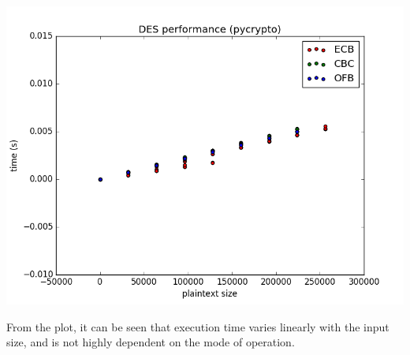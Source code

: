 \documentclass[main.tex]{subfiles}
\begin{document}

\includegraphics[width=\textwidth]{plot.png}

From the plot, it can be seen that execution time varies linearly with the input
size, and is not highly dependent on the mode of operation.
\end{document}
